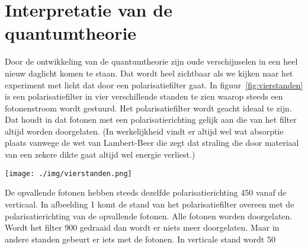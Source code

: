 {\section{Interpretatie van de quantumtheorie}
Door de ontwikkeling van de quantumtheorie zijn oude verschijnselen in een heel nieuw daglicht komen te staan. Dat wordt heel zichtbaar als we kijken naar het experiment met licht dat door een polarisatiefilter gaat. 
In figuur~\ref{fig:vierstanden} is een polarisatiefilter in vier verschillende standen te zien waarop steeds een fotonenstroom wordt gestuurd. Het polarisatiefilter wordt geacht ideaal te zijn. Dat houdt in dat fotonen met een polarisatierichting gelijk aan die van het filter altijd worden doorgelaten. (In werkelijkheid vindt er altijd wel wat absorptie plaats vanwege de wet van Lambert-Beer die zegt dat straling die door materiaal van een zekere dikte gaat altijd wel energie verliest.)

\begin{center}
\leavevmode
\texttt{[image: ./img/vierstanden.png]}
\end{center}

De opvallende fotonen hebben steeds dezelfde polarisatierichting 450 vanaf de verticaal. In afbeelding 1 komt de stand van het polarisatiefilter overeen met de polarisatierichting van de opvallende fotonen. Alle fotonen worden doorgelaten. Wordt het filter 900 gedraaid dan wordt er niets meer doorgelaten. Maar in andere standen gebeurt er iets met de fotonen. In verticale stand wordt 50%

}
